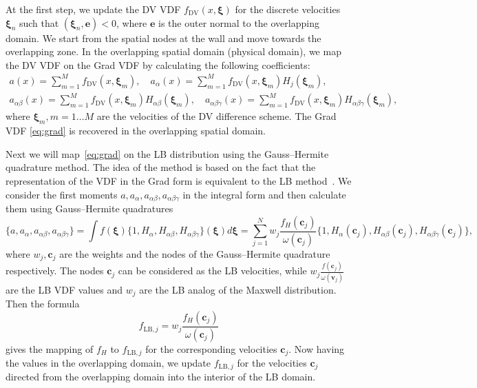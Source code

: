 \documentclass{elsarticle} %
\newcommand{\bxi}{\boldsymbol{\xi}}
\newcommand{\bv}{\boldsymbol{v}}
\newcommand{\bc}{\boldsymbol{c}}
\newcommand{\LB}{\mathrm{LB}\!}
\newcommand{\DV}{\mathrm{DV}\!}
\newcommand{\ai}{a_{\alpha}}
\newcommand{\aij}{a_{\alpha\beta}}
\newcommand{\aijk}{a_{\alpha\beta\gamma}}
\newcommand{\Hi}{H_{\alpha}}
\newcommand{\Hij}{H_{\alpha\beta}}
\newcommand{\Hijk}{H_{\alpha\beta\gamma}}
\begin{document}
At the first step, we update the DV VDF $f_\DV(x,\bxi)$ for the discrete velocities $\bxi_n$
such that $(\bxi_n,\mathbf{e})<0$, where $\mathbf{e}$ is the outer normal to the overlapping domain.
We start from the spatial nodes at the wall and move towards the overlapping zone.
In the overlapping spatial domain (physical domain), we map the DV VDF on the Grad VDF
by calculating the following coefficients:
\begin{equation}
    \begin{gathered}
        a(x)=\sum_{m=1}^M f_\DV(x,\bxi_m), \quad
        \ai(x)=\sum_{m=1}^Mf_\DV(x,\bxi_m)H_j(\bxi_m), \\
        \aij(x)=\sum_{m=1}^Mf_\DV(x,\bxi_m)\Hij(\bxi_m), \quad
        \aijk(x)=\sum_{m=1}^Mf_\DV(x,\bxi_m)\Hijk(\bxi_m),
    \end{gathered}
\end{equation}
where $\bxi_m, m=1 \ldots M$ are the velocities of the DV difference scheme.
The Grad VDF \eqref{eq:grad} is recovered in the overlapping spatial domain.

Next we will map~\eqref{eq:grad} on the LB distribution using the Gauss--Hermite quadrature method.
The idea of the method is based on the fact that the representation of the VDF in the Grad form
is equivalent to the LB method~\cite{He1997, Shan1998, Shan2006}.
We consider the first moments $a,\ai,\aij, \aijk$ in the integral form
and then calculate them using Gauss--Hermite quadratures
\begin{equation}
    \{ a, \ai, \aij, \aijk \}=\int f(\bxi)\{ 1, \Hi, \Hij, \Hijk \}(\bxi)d\bxi =
    \sum_{j=1}^N w_j\frac{f_H(\bc_j)}{\omega(\bc_j)} \{ 1, \Hi(\bc_j), \Hij(\bc_j), \Hijk(\bc_j) \},
\end{equation}
where $w_j, \bc_j$ are the weights and the nodes of the Gauss--Hermite quadrature respectively.
The nodes $\bc_j$ can be considered as the LB velocities,
while $ w_j\frac{f(\bc_j)}{\omega(\bv_j)}$ are the LB VDF values
and $w_j$ are the LB analog of the Maxwell distribution.
Then the formula
\begin{equation}\label{eq:grad_to_latt}
    f_{\LB,j} = w_j\frac{f_H(\bc_j)}{\omega(\bc_j)}
\end{equation}
gives the mapping of $f_H$ to $f_{\LB,j}$ for the corresponding velocities $\bc_j$.
Now having the values in the overlapping domain, we update $f_{\LB,j}$ for the velocities $\bc_j$
directed from the overlapping domain into the interior of the LB domain.
\end{document}
